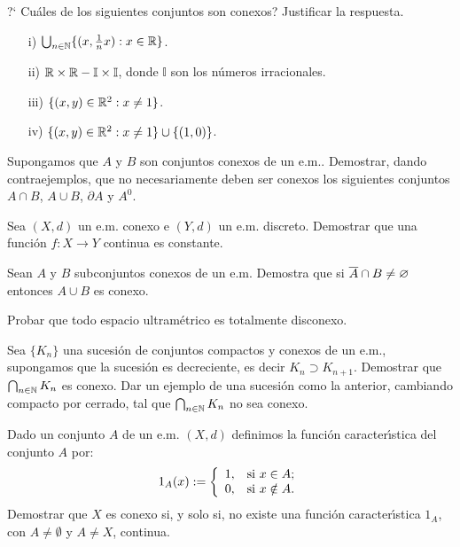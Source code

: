 \begin{ejercicio}{} ?` Cu\'ales de los siguientes conjuntos son
conexos? Justificar la respuesta.
\begin{itemize}
    \item[i)] $\bigcup_{n\in\mathbb{N}}\{(x,\frac1nx):x\in\mathbb{R}\}$.
    \item[ii)] $\mathbb{R}\times\mathbb{R}-\mathbb{I}\times\mathbb{I}$, donde
    $\mathbb{I}$ son los n\'umeros irracionales.
    \item[iii)] $\{(x,y)\in\mathbb{R}^2:x\neq 1\}$.
    \item[iv)] $\{(x,y)\in\mathbb{R}^2:x\neq 1\}\cup\{(1,0)\}$.
\end{itemize}
\end{ejercicio}

\begin{ejercicio}{} Supongamos que  $A$ y $B$ son conjuntos conexos
de un e.m.. Demostrar, dando contraejemplos, que no necesariamente
deben ser conexos los siguientes conjuntos $A\cap B$, $A\cup B$,
$\partial A$ y $A^0$.
\end{ejercicio}

\begin{ejercicio}{} Sea $(X,d)$ un e.m. conexo e $(Y,d)$ un e.m. discreto.
Demostrar que una funci\'on $f:X\to Y$ continua es constante.
\end{ejercicio}

\begin{ejercicio}{} Sean $A$ y $B$ subconjuntos conexos de un e.m.
Demostra que si $\overline{A}\cap B\neq\varnothing$ entonces $A\cup B$ es
conexo.
\end{ejercicio}

\begin{ejercicio}{} Probar que todo espacio ultram\'etrico es
totalmente disconexo.
\end{ejercicio}

\begin{ejercicio}{} Sea $\{K_n\}$ una sucesi\'on de conjuntos compactos y conexos
de un e.m., supongamos que la sucesi\'on es decreciente, es decir
$K_n\supset K_{n+1}$. Demostrar que $\bigcap_{n\in\mathbb{N}} K_n$ es
conexo. Dar un ejemplo de una sucesi\'on como la anterior,
cambiando compacto por cerrado, tal que $\bigcap_{n\in\mathbb{N}}K_n$ no
sea conexo.
\end{ejercicio}

\begin{ejercicio}{} Dado un conjunto $A$ de un e.m. $(X,d)$
definimos la funci\'on caracter\'{\i}stica del conjunto $A$ por:
\[
    1_A(x):=\left\{%
\begin{array}{ll}
    1, & \hbox{si $x\in A$;} \\
    0, & \hbox{si $x\notin A$.} \\
\end{array}%
\right.
\]
Demostrar que $X$ es conexo si, y solo si, no existe una funci\'on
caracter\'{\i}stica $1_A$, con $A\neq\emptyset$ y $A\neq X$,
continua.
\end{ejercicio}


